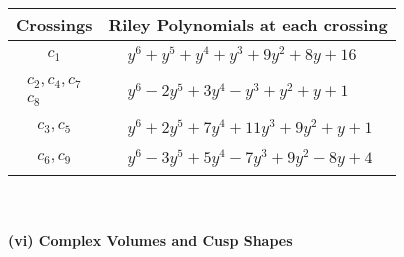 \documentclass[1p]{elsarticle_modified}
\theoremstyle{definition}
\begin{document}
\begin{tabular}{m{50pt}|m{274pt}}
Crossings & \hspace{64pt}Riley Polynomials at each crossing \\
\hline $$\begin{aligned}c_{1}\end{aligned}$$&$\begin{aligned}
&y^6+y^5+y^4+y^3+9 y^2+8 y+16
\end{aligned}$\\
\hline $$\begin{aligned}c_{2},c_{4},c_{7}\\c_{8}\end{aligned}$$&$\begin{aligned}
&y^6-2 y^5+3 y^4- y^3+y^2+y+1
\end{aligned}$\\
\hline $$\begin{aligned}c_{3},c_{5}\end{aligned}$$&$\begin{aligned}
&y^6+2 y^5+7 y^4+11 y^3+9 y^2+y+1
\end{aligned}$\\
\hline $$\begin{aligned}c_{6},c_{9}\end{aligned}$$&$\begin{aligned}
&y^6-3 y^5+5 y^4-7 y^3+9 y^2-8 y+4
\end{aligned}$\\
\hline
\end{tabular}\\~\\
\newpage\flushleft \textbf{(vi) Complex Volumes and Cusp Shapes}
\end{document}
